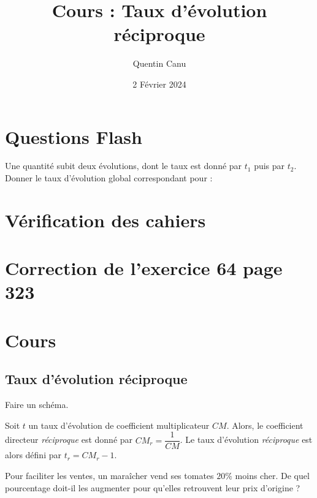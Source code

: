 \documentclass{article}
\title{Cours : Taux d'évolution réciproque}
\date{2 Février 2024}
\author{Quentin Canu}
\begin{document}
\maketitle
\section{Questions Flash}
Une quantité subit deux évolutions, dont le taux est donné par $t_1$ puis par $t_2$. Donner le taux d'évolution global correspondant pour :
\begin{enumerate}
\end{enumerate}
\section{Vérification des cahiers}
\section{Correction de l'exercice 64 page 323}
\section{Cours}
\subsection*{Taux d'évolution réciproque}
Faire un schéma.
\begin{definition}
Soit $t$ un taux d'évolution de coefficient multiplicateur $CM$. Alors, le coefficient directeur \emph{réciproque} est donné par $CM_r = \dfrac{1}{CM}$. Le taux d'évolution \emph{réciproque} est alors défini par $t_r = CM_r - 1$.
\end{definition}
\begin{example}
Pour faciliter les ventes, un maraîcher vend ses tomates $20\%$ moins cher. De quel pourcentage doit-il les augmenter pour qu'elles retrouvent leur prix d'origine ?
\end{example}
\end{document}
